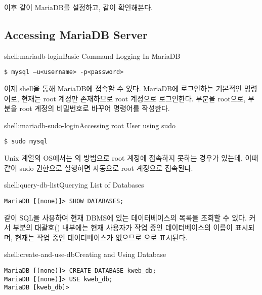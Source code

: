 이후 \와 같이 MariaDB를 설정하고, \와 같이 확인해본다.

\subsection*{Accessing MariaDB Server}

\begin{shell}{shell:mariadb-login}{Basic Command Logging In MariaDB}
\begin{verbatim}
$ mysql –u<username> -p<password>
\end{verbatim}
\end{shell}

이제 shell을 통해 MariaDB에 접속할 수 있다. \은 MariaDB에 로그인하는 기본적인 명령어로, 현재는 root 계정만 존재하므로 root 계정으로 로그인한다.  부분을 root으로,  부분을 root 계정의 비밀번호로 바꾸어 명령어를 작성한다.

\begin{shell}{shell:mariadb-sudo-login}{Accessing root User using sudo}
\begin{verbatim}
$ sudo mysql
\end{verbatim}
\end{shell}

Unix 계열의 OS에서는 의 방법으로 root 계정에 접속하지 못하는 경우가 있는데, 이때 \과 같이 sudo 권한으로 실행하면 자동으로 root 계정으로 접속된다.

\begin{shell}{shell:query-db-list}{Querying List of Databases}
\begin{verbatim}
MariaDB [(none)]> SHOW DATABASES;
\end{verbatim}
\end{shell}

\와 같이 SQL을 사용하여 현재 DBMS에 있는 데이터베이스의 목록을 조회할 수 있다. 커서 부분의 대괄호(\cd{[]}) 내부에는 현재 사용자가 작업 중인 데이터베이스의 이름이 표시되며, 현재는 작업 중인 데이터베이스가 없으므로 으로 표시된다.

\begin{shell}{shell:create-and-use-db}{Creating and Using Database}
\begin{verbatim}
MariaDB [(none)]> CREATE DATABASE kweb_db;
MariaDB [(none)]> USE kweb_db;
MariaDB [kweb_db]>
\end{verbatim}
\end{shell}

